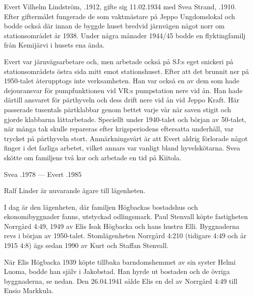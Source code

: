 Evert Vilhelm Lindström, .1912, gifte sig 11.02.1934 med Svea Strand, .1910. Efter giftermålet fungerade de som vaktmästare på Jeppo Ungdomslokal och bodde också där innan de byggde huset bredvid järnvägen något norr om stationsområdet år 1938. Under några månader 1944/45 bodde en flyktingfamilj från Kemijärvi i husets ena ända.

Evert var järnvägsarbetare och, men arbetade också på SJ:s eget snickeri på stationsområdets östra sida mitt emot stationshuset. Efter att det brunnit ner på 1950-talet återupptogs inte verksamheten. Han var också en av dem som hade dejouransvar för pumpfunktionen vid VR:s pumpstation nere vid ån. Han hade därtill ansvaret för pärthyveln och dess drift nere vid ån vid Jeppo Kraft. Här passerade tusentals pärtklabbar genom bettet varje vår när saven stigit och gjorde klabbarna lättarbetade. Speciellt under 1940-talet och början av 50-talet, när många tak skulle repareras efter krigsperiodens eftersatta underhåll, var trycket på pärthyveln stort. Anmärkningsvärt är att Evert aldrig förlorade något finger i det farliga arbetet, vilket annars var vanligt bland hyvelskötarna. Svea skötte om familjens två kor och  arbetade en tid på Kiitola.
\begin{jhchildren}
  \item {}
  \item {}
\end{jhchildren}

Svea .1978  ---  Evert .1985





Ralf Linder är nuvarande ägare till lägenheten.\jhvspace{}


I dag är den lägenheten, där familjen Högbackas bostadshus och ekonomibyggnader fanns, utstyckad odlingsmark. Paul Stenvall köpte fastigheten Norrgård 4:49, 1949 av Elis Isak Högbacka och hans hustru Elli. Byggnaderna revs i början av 1950-talet. Stomlägenheten Norrgård 4:210 (tidigare 4:49 och år 1915 4:8) ägs sedan 1990 av Kurt och Staffan Stenvall.


När Elis Högbacka 1939 köpte tillbaka barndomshemmet av sin syster Helmi Luoma, bodde han själv i Jakobstad. Han hyrde ut bostaden och de övriga byggnaderna, se nedan. Den 26.04.1941 sålde Elis en del av Norrgård 4:49 till Ensio Markkula.

